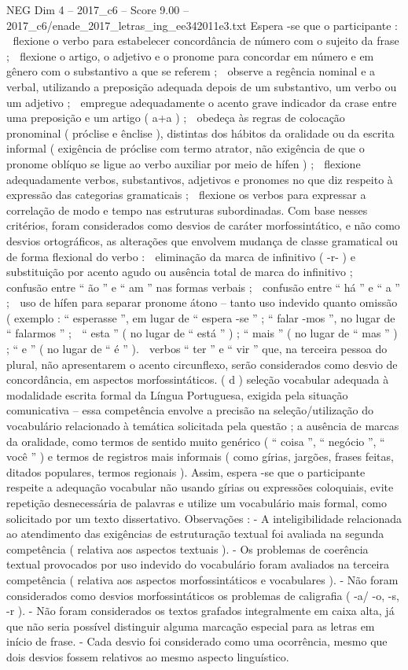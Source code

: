 \begin{textsample}{NEG Dim 4 – 2017\_c6 – Score 9.00 – 2017\_c6/enade\_2017\_letras\_ing\_ee342011e3.txt}
Espera -se que o participante :  flexione o verbo para estabelecer concordância de número com o sujeito da frase ;  flexione o artigo, o adjetivo e o pronome para concordar em número e em gênero com o substantivo a que se referem ;  observe a regência nominal e a verbal, utilizando a preposição adequada depois de um substantivo, um verbo ou um adjetivo ;  empregue adequadamente o acento grave indicador da crase entre uma preposição e um artigo ( a+a ) ;  obedeça às regras de colocação pronominal ( próclise e ênclise ), distintas dos hábitos da oralidade ou da escrita informal ( exigência de próclise com termo atrator, não exigência de que o pronome oblíquo se ligue ao verbo auxiliar por meio de hífen ) ;  flexione adequadamente verbos, substantivos, adjetivos e pronomes no que diz respeito à expressão das categorias gramaticais ;  flexione os verbos para expressar a correlação de modo e tempo nas estruturas subordinadas.
Com base nesses critérios, foram considerados como desvios de caráter morfossintático, e não como desvios ortográficos, as alterações que envolvem mudança de classe gramatical ou de forma flexional do verbo :  eliminação da marca de infinitivo ( -r- ) e substituição por acento agudo ou ausência total de marca do infinitivo ;  confusão entre “ ão ” e “ am ” nas formas verbais ;  confusão entre “ há ” e “ a ” ;  uso de hífen para separar pronome átono – tanto uso indevido quanto omissão ( exemplo : “ esperasse ”, em lugar de “ espera -se ” ; “ falar -mos ”, no lugar de “ falarmos ” ;  “ esta ” ( no lugar de “ está ” ) ; “ mais ” ( no lugar de “ mas ” ) ; “ e ” ( no lugar de “ é ” ).  verbos “ ter ” e “ vir ” que, na terceira pessoa do plural, não apresentarem o acento circunflexo, serão considerados como desvio de concordância, em aspectos morfossintáticos. ( d ) seleção vocabular adequada à modalidade escrita formal da Língua Portuguesa, exigida pela situação comunicativa – essa competência envolve a precisão na seleção/utilização do vocabulário relacionado à temática solicitada pela questão ; a ausência de marcas da oralidade, como termos de sentido muito genérico ( “ coisa ”, “ negócio ”, “ você ” ) e termos de registros mais informais ( como gírias, jargões, frases feitas, ditados populares, termos regionais ).
Assim, espera -se que o participante respeite a adequação vocabular não usando gírias ou expressões coloquiais, evite repetição desnecessária de palavras e utilize um vocabulário mais formal, como solicitado por um texto dissertativo.
Observações : - A inteligibilidade relacionada ao atendimento das exigências de estruturação textual foi avaliada na segunda competência ( relativa aos aspectos textuais ). - Os problemas de coerência textual provocados por uso indevido do vocabulário foram avaliados na terceira competência ( relativa aos aspectos morfossintáticos e vocabulares ). - Não foram considerados como desvios morfossintáticos os problemas de caligrafia ( -a/ -o, -s, -r ). - Não foram considerados os textos grafados integralmente em caixa alta, já que não seria possível distinguir alguma marcação especial para as letras em início de frase. - Cada desvio foi considerado como uma ocorrência, mesmo que dois desvios fossem relativos ao mesmo aspecto linguístico.

\end{textsample}

